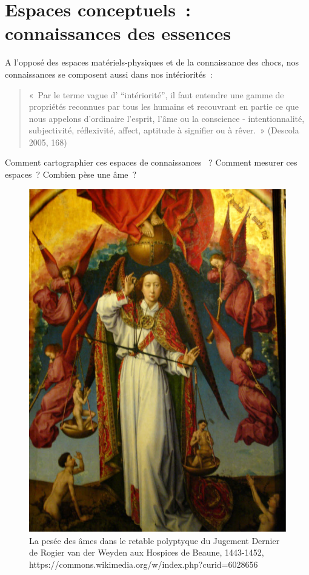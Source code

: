 \documentclass[
  letterpaper,
  DIV=11,
  numbers=noendperiod]{scrreprt}
\begin{document}
\hypertarget{sec-espaceConceptuels}{%
\section{Espaces conceptuels~: connaissances des
essences}\label{sec-espaceConceptuels}}

A l'opposé des espaces matériels-physiques et de la connaissance des
chocs, nos connaissances se composent aussi dans nos intériorités~:

\begin{quote}
«~Par le terme vague d' ``intériorité'', il faut entendre une gamme de
propriétés reconnues par tous les humains et recouvrant en partie ce que
nous appelons d'ordinaire l'esprit, l'âme ou la conscience -
intentionnalité, subjectivité, réflexivité, affect, aptitude à signifier
ou à rêver.~» (Descola 2005, 168)
\end{quote}

Comment cartographier ces espaces de connaissances ~? Comment mesurer
ces espaces~? Combien pèse une âme~?

\begin{figure}

{\centering \includegraphics{media/100000000000026C0000033BDE0C2A2E5F4A6C07.jpg}

}

\caption{\label{fig-peseeAme}La pesée des âmes dans le retable
polyptyque du Jugement Dernier de Rogier van der Weyden aux Hospices de
Beaune, 1443-1452,
https://commons.wikimedia.org/w/index.php?curid=6028656}

\end{figure}
\end{document}
